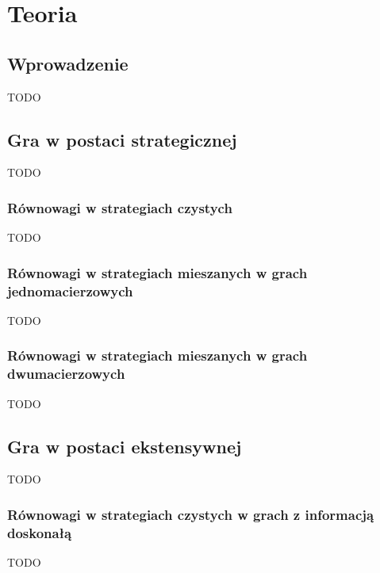 \documentclass[00_main.tex]{subfiles}
\begin{document}
\pagestyle{headings}

\chapter{Teoria}

\section{Wprowadzenie}

TODO

\section{Gra w postaci strategicznej}

TODO

\subsection{Równowagi w strategiach czystych}

TODO

\subsection{Równowagi w strategiach mieszanych w grach jednomacierzowych}

TODO

\subsection{Równowagi w strategiach mieszanych w grach dwumacierzowych}

TODO

\section{Gra w postaci ekstensywnej}

TODO

\subsection{Równowagi w strategiach czystych w grach z informacją doskonałą}

TODO
\end{document}
